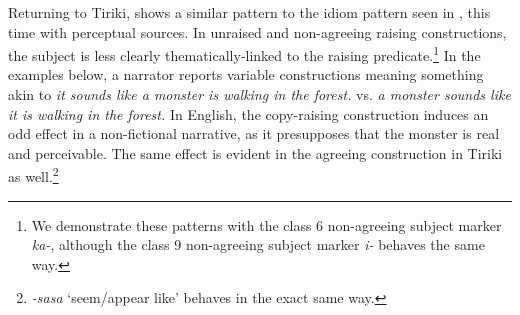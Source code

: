 \documentclass[output=paper,colorlinks,citecolor=brown
]{langscibook}
\begin{document}
Returning to Tiriki,  shows a similar pattern to the idiom pattern seen in , this time with perceptual sources. In unraised  and non-agreeing raising  constructions, the subject is less clearly thematically-linked to the raising predicate.\footnote{We demonstrate these patterns with the class 6 non-agreeing subject marker \textit{ka-}, although the class 9 non-agreeing subject marker \textit{i-} behaves the same way.} In the examples below, a narrator reports variable constructions meaning something akin to \textit{it sounds like a monster is walking in the forest.} vs. \textit{a monster sounds like it is walking in the forest.} In English, the copy-raising construction induces an odd effect in a non-fictional narrative, as it presupposes that the monster is real and perceivable. The same effect is evident in the agreeing construction in Tiriki as well.\footnote{\textit{-sasa} `seem/appear like' behaves in the exact same way.}


\ea\label{ex:johnson:MonsterSoundsLike}
\end{document}

